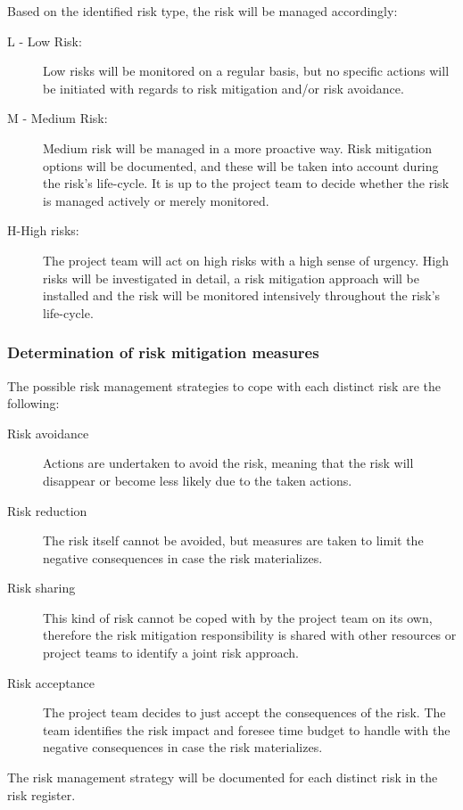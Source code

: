 \noindent
Based on the identified risk type, the risk will be managed accordingly:
\begin{description}
    \item [L - Low Risk:]
    Low risks will be monitored on a regular basis, but no specific actions will be initiated with regards to risk mitigation and/or risk avoidance.
    \item [M - Medium Risk:]
    Medium risk will be managed in a more proactive way.
    Risk mitigation options will be documented, and these will be taken into account during the risk's life-cycle.
    It is up to the project team to decide whether the risk is managed actively or merely monitored.
    \item[H-High risks:]
    The project team will act on high risks with a high sense of urgency.
    High risks will be investigated in detail, a risk mitigation approach will be installed and the risk will be monitored intensively throughout the risk's life-cycle.
\end {description}

\subsubsection{Determination of risk mitigation measures}
The possible risk management strategies to cope with each distinct risk are the following:
\begin{description}
    \item [Risk avoidance]
    Actions are undertaken to avoid the risk, meaning that the risk will disappear or become less likely due to the taken actions.
    \item[Risk reduction]
    The risk itself cannot be avoided, but measures are taken to limit the negative consequences in case the risk materializes.
    \item[Risk sharing]
    This kind of risk cannot be coped with by the project team on its own, therefore the risk mitigation responsibility is shared with other resources or project teams to identify a joint risk approach.
    \item[Risk acceptance]
    The project team decides to just accept the consequences of the risk.
    The team identifies the risk impact and foresee time budget to handle with the negative consequences in case the risk materializes.
\end {description}

\noindent
The risk management strategy will be documented for each distinct risk in the risk register.

